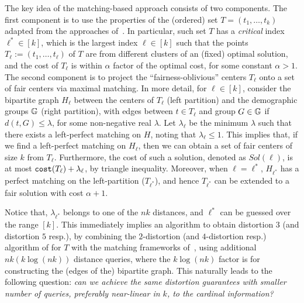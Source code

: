 \documentclass{article}
\begin{document}
The key idea of the matching-based approach consists of two components. 
The first component is to use the properties of the (ordered) set $T=(t_1,\dots,t_k)$ adapted from the approaches of~\citet{gonzalez1985clustering}.  
In particular, such set $T$ has a \emph{critical} index $\ell^* \in [k]$, which is the largest index $\ell \in [k]$ such that the points $T_\ell := (t_1,\dots,t_\ell)$ of $T$ are from different clusters of an (fixed) optimal solution, and the cost of $T_\ell$ is within $\alpha$ factor of the optimal cost, for some constant $\alpha>1$. 
The second component is to project the ``fairness-oblivious'' centers $T_{\ell}$ onto a set of fair centers via maximal matching. 
In more detail, for $\ell \in [k]$, consider the bipartite graph $H_\ell$ between the centers of $T_{\ell}$ (left partition) and the demographic groups $\mathbb{G}$ (right partition), with edges between $t \in T_{\ell}$ and group $G \in \mathbb{G}$ if $d(t,G) \le \lambda$, for some non-negative real $\lambda$.
Let $\lambda_{\ell}$ be the minimum $\lambda$ such that there exists a left-perfect matching on $H$, noting that $\lambda_\ell\le 1$.
This implies that, if we find a left-perfect matching on $H_\ell$, then we can obtain a set of fair centers of size $k$ from $T_{\ell}$.
Furthermore, the cost of such a solution, denoted as $Sol(\ell)$, is at most $\texttt{cost}(T_{\ell}) + \lambda_{\ell}$, by triangle inequality.
Moreover, when $\ell = \ell^*$, $H_{\ell^*}$ has a perfect matching on the left-partition ($T_{\ell^*}$), and hence $T_{\ell^*}$ can be extended to a fair solution with cost $\alpha+1$.



Notice that, $\lambda_{\ell^*}$ belongs to one of the $nk$ distances, and $\ell^{*}$ can be guessed over the range $[k]$.
This immediately implies an algorithm to obtain distortion $3$ (and distortion $5$ resp.), by combining the $2$-distortion (and $4$-distortion resp.) algorithm of \cite{burkhardt2024low} for $T$ with the matching frameworks of~\cite{jones2020fair,gadekar2025fair}, using additional $nk(k\log (nk))$ distance queries, where the $k \log (nk)$ factor is for constructing the (edges of the) bipartite graph. 
This naturally leads to the following question: \emph{can we achieve the same distortion guarantees with smaller number of queries, preferably near-linear in $k$, to the cardinal information?}

\vspace{1em}
\end{document}
